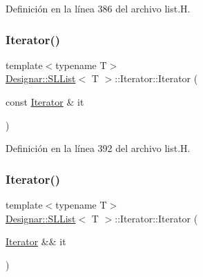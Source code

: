Definición en la línea 386 del archivo list.\+H.

\mbox{\label{class_designar_1_1_s_l_list_1_1_iterator_ae6726c755567d34649157c075b825a20}} 
\subsubsection{\texorpdfstring{Iterator()}{Iterator()}\hspace{0.1cm}{\footnotesize\ttfamily [4/5]}}
{\footnotesize\ttfamily template$<$typename T$>$ \\
\hyperlink{class_designar_1_1_s_l_list}{Designar\+::\+S\+L\+List}$<$ T $>$\+::Iterator\+::\+Iterator (\begin{DoxyParamCaption}\item[{const \hyperlink{class_designar_1_1_s_l_list_1_1_iterator}{Iterator} \&}]{it }\end{DoxyParamCaption})\hspace{0.3cm}{\ttfamily [inline]}}



Definición en la línea 392 del archivo list.\+H.

\mbox{\label{class_designar_1_1_s_l_list_1_1_iterator_a2d8fece759af352a51982b4ffb25f351}} 
\subsubsection{\texorpdfstring{Iterator()}{Iterator()}\hspace{0.1cm}{\footnotesize\ttfamily [5/5]}}
{\footnotesize\ttfamily template$<$typename T$>$ \\
\hyperlink{class_designar_1_1_s_l_list}{Designar\+::\+S\+L\+List}$<$ T $>$\+::Iterator\+::\+Iterator (\begin{DoxyParamCaption}\item[{\hyperlink{class_designar_1_1_s_l_list_1_1_iterator}{Iterator} \&\&}]{it }\end{DoxyParamCaption})\hspace{0.3cm}{\ttfamily [inline]}}



